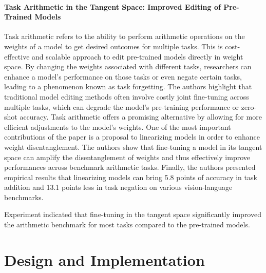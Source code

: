 \documentclass[conference]{IEEEtran}
\begin{document}
\paragraph{Task Arithmetic in the Tangent Space: Improved Editing of Pre-Trained Models} Task arithmetic refers to the ability to perform arithmetic operations on the weights of a model to get desired outcomes for multiple tasks\cite{paper-3}. This is cost-effective and scalable approach to edit pre-trained models directly in weight space. By changing the weights associated with different tasks, researchers can enhance a model's performance on those tasks or even negate certain tasks, leading to a phenomenon known as task forgetting. The authors highlight that traditional model editing methods often involve costly joint fine-tuning across multiple tasks, which can degrade the model's pre-training performance or zero-shot accuracy. Task arithmetic offers a promising alternative by allowing for more efficient adjustments to the model's weights.
One of the most important contributions of the paper is a proposal to linearizing models in order to enhance weight disentanglement. The authors show that fine-tuning a model in its tangent space can amplify the disentanglement of weights and thus effectively improve performances across benchmark arithmetic tasks. Finally, the authors presented empirical results that linearizing models can bring 5.8 points of accuracy in task addition and 13.1 points less in task negation on various vision-language benchmarks.

Experiment indicated that fine-tuning in the tangent space significantly improved the arithmetic benchmark for most tasks compared to the pre-trained models. 



\section{Design and Implementation}
\end{document}
